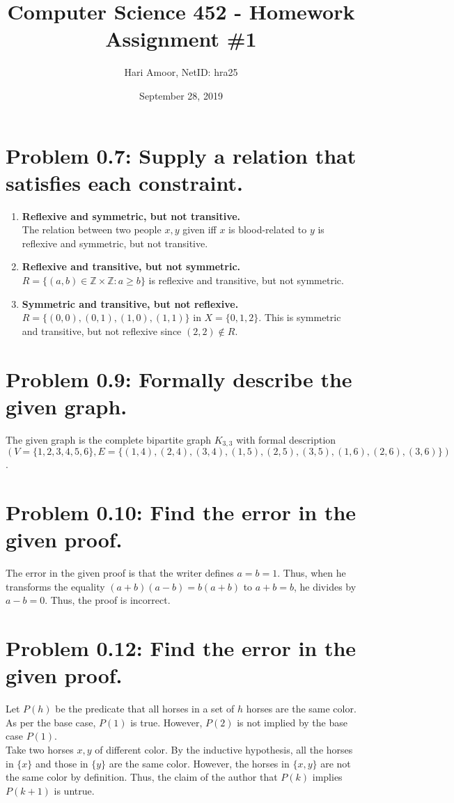 \documentclass[12pt]{article}
\title{Computer Science 452 - Homework Assignment \#1}
\author{Hari Amoor, NetID: hra25}
\date{September 28, 2019}
\begin{document}
\maketitle

\section*{Problem 0.7: Supply a relation that satisfies each constraint.}
\begin{enumerate}[label=(\alph*)]
	\item \textbf{Reflexive and symmetric, but not transitive.} \\
		\newline
		The relation between two people $x, y$ given iff $x$ is blood-related to $y$ is reflexive and symmetric, but not transitive.
	\item \textbf{Reflexive and transitive, but not symmetric.} \\
		\newline
		$R = \{(a, b) \in \mathbb{Z} \times \mathbb{Z} : a \geq b\}$ is reflexive and transitive, but not symmetric.
	\item \textbf{Symmetric and transitive, but not reflexive.} \\
		\newline
		$R = \{(0, 0), (0, 1), (1, 0), (1, 1)\}$ in $X = \{0, 1, 2\}$. This is symmetric and transitive, but not reflexive since $(2, 2) \notin R$.
\end{enumerate}

\section*{Problem 0.9: Formally describe the given graph.}
The given graph is the complete bipartite graph $K_{3, 3}$ with formal description $(V = \{1, 2, 3, 4, 5, 6\}, E = \{(1, 4), (2, 4), (3, 4), (1, 5), (2, 5), (3, 5), (1, 6), (2, 6), (3, 6)\})$.

\section*{Problem 0.10: Find the error in the given proof.}
The error in the given proof is that the writer defines $a = b = 1$. Thus, when he transforms the equality $(a + b)(a - b) = b(a + b)$ to $a + b = b$, he divides by $a - b = 0$. Thus, the proof is incorrect.

\section*{Problem 0.12: Find the error in the given proof.}
Let $P(h)$ be the predicate that all horses in a set of $h$ horses are the same color. As per the base case, $P(1)$ is true. However, $P(2)$ is not implied by the base case $P(1)$. \\
\newline
Take two horses $x, y$ of different color. By the inductive hypothesis, all the horses in $\{x\}$ and those in $\{y\}$ are the same color. However, the horses in $\{x, y\}$ are not the same color by definition. Thus, the claim of the author that $P(k)$ implies $P(k + 1)$ is untrue.
\end{document}
